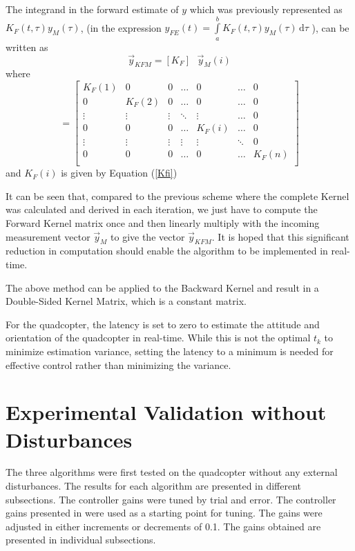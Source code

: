 \documentclass[letterpaper%
, twoside%
, 12pt%
,memoire%
, english%
,creativecommons,hyperref%
]{thETS}
\begin{document}
The integrand in the forward estimate of $y$ which was previously represented as
$K_F(t,\tau) y_M(\tau)$, 
(in the expression $y_{FE}(t) =\int\limits_{a}^{b}K_F(t,\tau) y_M(\tau)\, \mathrm{d}\tau $ ), 
can be written as 
$$ \vec{y}_{KFM} = [K_F] \textrm{ } \vec{y}_M(i)$$
where 
\begin{equation*}
[K_F] =
\begin{bmatrix}
    K_F(1) &    0   &   0    & \dots  &    0    & \dots  &   0 \\
      0    & K_F(2) &   0    & \dots  &    0    & \dots  &   0 \\
    \vdots & \vdots & \vdots & \ddots & \vdots  & \dots  &   0 \\
      0    &   0    &   0    & \dots  &  K_F(i) & \dots  &   0 \\ 
    \vdots & \vdots & \vdots & \vdots & \vdots  & \ddots &   0 \\
      0    &   0    &   0    & \dots  &    0    & \dots  &   K_F(n) \\
\end{bmatrix}
\end{equation*}
and $K_F(i)$ is given by Equation (\ref{Kfi})

It can be seen that, compared to the previous scheme where the complete Kernel was calculated and derived in each iteration, we just have to compute the Forward Kernel matrix once and then linearly multiply with the incoming measurement vector $\vec{y}_M$ to give the vector $\vec{y}_{KFM}$.
It is hoped that this significant reduction in computation should enable the algorithm to be implemented in real-time. 

The above method can be applied to the Backward Kernel and result in a Double-Sided Kernel Matrix, which is a constant matrix.

For the quadcopter, the latency is set to zero to estimate the attitude and orientation of the quadcopter in real-time. While this is not the optimal $t_k$ to minimize estimation variance, setting the latency to a minimum is needed for effective control rather than minimizing the variance. 

\section{Experimental Validation without Disturbances}
The three algorithms were first tested on the quadcopter without any external disturbances. The results for each algorithm are presented in different subsections. The controller gains were tuned by trial and error. The controller gains presented in \citep{RN117} were used as a starting point for tuning. The gains were adjusted in either increments or decrements of 0.1. The gains obtained are presented in individual subsections. 
\end{document}
